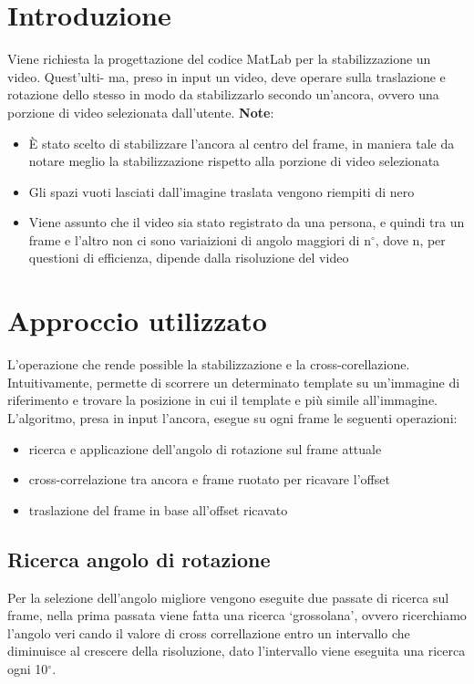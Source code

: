 \documentclass[12pt]{article}
\begin{document}
\section{Introduzione}
Viene richiesta la progettazione del codice MatLab per la stabilizzazione un video. Quest'ulti-
ma, preso in input un video, deve operare sulla traslazione e rotazione dello stesso in modo da
stabilizzarlo secondo un'ancora, ovvero una porzione di video selezionata dall'utente.
\textbf{Note}:
\begin{itemize}
\item È stato scelto di stabilizzare l'ancora al centro del frame, in maniera tale da notare meglio la stabilizzazione rispetto alla porzione di video selezionata
\item Gli spazi vuoti lasciati dall'imagine traslata vengono riempiti di nero
\item Viene assunto che il video sia stato registrato da una persona, e quindi tra un frame e l'altro non ci sono variaizioni di angolo maggiori di n$^{\circ}$, dove n, per questioni di efficienza, dipende dalla risoluzione del video
\end{itemize}

\clearpage
\section{Approccio utilizzato}
L'operazione che rende possible la stabilizzazione e la cross-corellazione. Intuitivamente, permette di scorrere un determinato template su un'immagine di riferimento e trovare la posizione in cui il template e più simile all'immagine.
L'algoritmo, presa in input l'ancora, esegue su ogni frame le seguenti operazioni:

\begin{itemize}
\item ricerca e applicazione dell'angolo di rotazione sul frame attuale
\item cross-correlazione tra ancora e frame ruotato per ricavare l'offset
\item traslazione del frame in base all'offset ricavato
\end{itemize}

\subsection{Ricerca angolo di rotazione}
Per la selezione dell'angolo migliore vengono eseguite due passate di ricerca sul frame, nella prima passata viene fatta una ricerca `grossolana', ovvero ricerchiamo l'angolo vericando il valore di cross correllazione entro un intervallo che diminuisce al crescere della risoluzione, dato l'intervallo viene eseguita una ricerca ogni 10$^{\circ}$.
\end{document}
